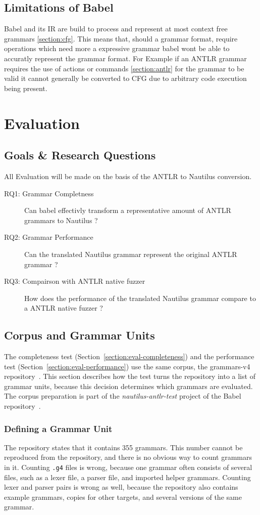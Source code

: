 \documentclass[thesis]{plai}
\begin{document}
\section{Limitations of Babel}
Babel and its IR are build to process and represent at most context free grammars \ref{section:cfg}. This means that, should a grammar format, require operations which need more a expressive grammar babel wont be able to accuratly represent the grammar format. For Example if an ANTLR grammar requires the use of actions or commands \ref{section:antlr} for the grammar to be valid it cannot generally be converted to CFG due to arbitrary code execution being present.
\chapter{Evaluation}
\label{chapter:evaluation}
\section{Goals \& Research Questions}
All Evaluation will be made on the basis of the ANTLR to Nautilus conversion.
\begin{description}
    \item[RQ1: Grammar Completness] Can babel effectivly transform a representative amount of ANTLR grammars to Nautilus ?
    \item[RQ2: Grammar Performance] Can the translated Nautilus grammar represent the original ANTLR grammar ? 
    \item[RQ3: Compairson with ANTLR native fuzzer] How does the performance of the translated Nautilus grammar compare to a ANTLR native fuzzer ?
\end{description}

\section{Corpus and Grammar Units}
\label{section:eval-corpus}
The completeness test (Section~\ref{section:eval-completeness}) and the performance test (Section~\ref{section:eval-performance}) use the same corpus, the grammars-v4 repository~\cite{grammars-v4}. This section describes how the test turns the repository into a list of grammar units, because this decision determines which grammars are evaluated. The corpus preparation is part of the \emph{nautilus-antlr-test} project of the Babel repository~\cite{babel-github}.

\subsection{Defining a Grammar Unit}
The repository states that it contains 355 grammars. This number cannot be reproduced from the repository, and there is no obvious way to count grammars in it. Counting \texttt{.g4} files is wrong, because one grammar often consists of several files, such as a lexer file, a parser file, and imported helper grammars. Counting lexer and parser pairs is wrong as well, because the repository also contains example grammars, copies for other targets, and several versions of the same grammar.
\end{document}
